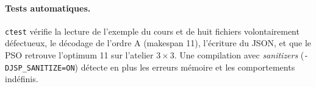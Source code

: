 \documentclass[11pt,a4paper]{article}
\begin{document}
\paragraph{Tests automatiques.} \texttt{ctest} vérifie la lecture de l'exemple du cours et
de huit fichiers volontairement défectueux, le décodage de l'ordre A (makespan 11),
l'écriture du JSON, et que le PSO retrouve l'optimum 11 sur l'atelier $3\times3$. Une
compilation avec \emph{sanitizers} (\texttt{-DJSP\_SANITIZE=ON}) détecte en plus les erreurs
mémoire et les comportements indéfinis.
\end{document}
